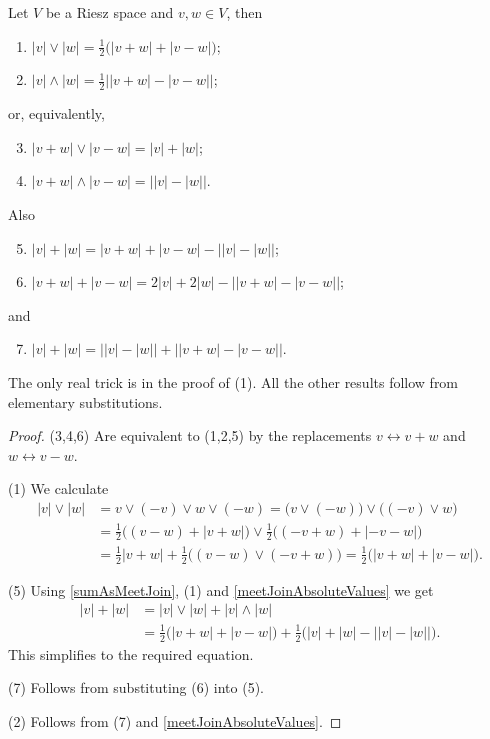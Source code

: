 \begin{proposition} \label{meetJoinAbsoluteValues2}
Let $V$ be a Riesz space and $v,w\in V$, then
\begin{enumerate}
\item $|v|\vee |w| = \frac{1}{2}\Big( |v+w| + |v - w| \Big)$;
\item $|v|\wedge |w| = \frac{1}{2}\Big| |v+w| - |v - w| \Big|$;
\end{enumerate}
or, equivalently,
\begin{enumerate} \setcounter{enumi}{2}
\item $|v+w|\vee |v-w| = |v| + |w|$;
\item $|v+w|\wedge |v-w| = \big| |v| - |w| \big|$.
\end{enumerate}
Also
\begin{enumerate} \setcounter{enumi}{4}
\item $|v|+|w| = |v+w| + |v-w| - \big||v|-|w|\big|$;
\item $|v+w|+|v-w| = 2|v| + 2|w| - \big||v+w|-|v-w|\big|$;
\end{enumerate}
and
\begin{enumerate} \setcounter{enumi}{6}
\item $|v|+|w| = \big||v|-|w|\big| + \big||v+w|-|v-w|\big|$.
\end{enumerate}
\end{proposition}
The only real trick is in the proof of (1). All the other results follow from elementary substitutions.
\begin{proof}
(3,4,6) Are equivalent to (1,2,5) by the replacements $v \leftrightarrow v+w$ and $w \leftrightarrow v-w$.

(1) We calculate
\begin{align*}
|v|\vee |w| &= v\vee (-v)\vee w \vee (-w) = \big(v\vee(-w)\big)\vee \big((-v)\vee w\big) \\
&= \frac{1}{2}\Big((v-w) + |v + w|\Big)\vee \frac{1}{2}\Big( (-v+w) + |- v - w| \Big) \\
&= \frac{1}{2}|v+ w| + \frac{1}{2}\big((v-w)\vee (-v+w)\big) = \frac{1}{2}\Big( |v+w| + |v - w| \Big).
\end{align*}

(5) Using \ref{sumAsMeetJoin}, (1) and \ref{meetJoinAbsoluteValues} we get
\begin{align*}
|v|+|w| &= |v|\vee|w| + |v|\wedge |w| \\
&= \frac{1}{2}\Big( |v+w| + |v - w| \Big) + \frac{1}{2}\Big(|v|+|w| - \big||v| - |w|\big|\Big).
\end{align*}
This simplifies to the required equation.

(7) Follows from substituting (6) into (5).

(2) Follows from (7) and \ref{meetJoinAbsoluteValues}.
\end{proof}


